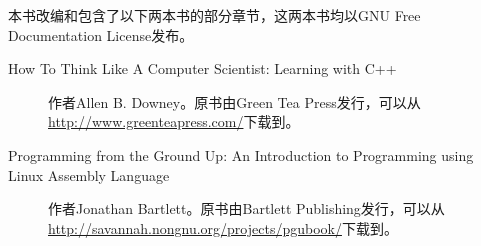 

%
本书改编和包含了以下两本书的部分章节，这两本书均以GNU Free Documentation License发布。


\begin{description}
\item[{How To Think Like A Computer Scientist:\BookSplit{} Learning with C+\BookSplit{}+\BookSplit{}}]


作者Allen B.\BookSplit{} Downey。原书由Green Tea Press发行，可以从\url{http://www.greenteapress.com/}下载到。

\item[{Programming from the Ground Up:\BookSplit{} An Introduction to Programming using Linux Assembly Language}]


作者Jonathan Bartlett。原书由Bartlett Publishing发行，可以从\url{http://savannah.nongnu.org/projects/pgubook/}下载到。


\end{description}

